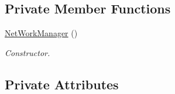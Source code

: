 \subsection*{Private Member Functions}
\begin{DoxyCompactItemize}
\item 
\mbox{\label{class_net_work_manager_ae09c43f9bd232bf8a8edb79e0c7f8dac}} 
\hyperlink{class_net_work_manager_ae09c43f9bd232bf8a8edb79e0c7f8dac}{Net\+Work\+Manager} ()
\begin{DoxyCompactList}\small\item\em Constructor. \end{DoxyCompactList}\end{DoxyCompactItemize}
\subsection*{Private Attributes}
